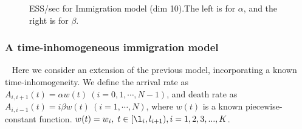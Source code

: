 \begin{figure}
\begin{minipage}[hp]{0.45\linewidth}
    \vspace{-0 in}
     \label{fig:ESS_Q_D10}
  \end{minipage}
    \caption{ESS/sec for Immigration model (dim 10).The left is for $\alpha$, and the right is for $\beta$.}
  \end{figure}

\subsubsection{A time-inhomogeneous immigration model}~
Here we consider an extension of the previous model, incorporating a known
time-inhomogeneity. We define the arrival rate as
$A_{i, i+1}(t) = \alpha w(t) \ (i =0,1,\cdots,N-1)$, and death rate as
$A_{i, i-1}(t)  = i\beta w(t) \  (i =1,\cdots,N)$, where $w(t)$ is a known
piecewise-constant function.
 $w(t) = w_i, \; t \in [\l_i, l_{i + 1}), i = 1,2,3,..., K$.


